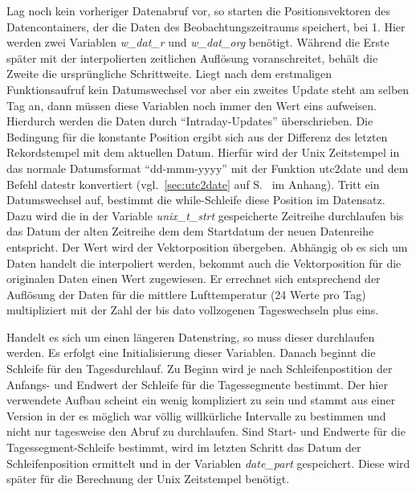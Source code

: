 Lag noch kein vorheriger Datenabruf vor, so starten die Positionsvektoren des Datencontainers, der die Daten des Beobachtungszeitraums speichert, bei 1. Hier werden zwei Variablen \textit{w\_dat\_r} und \textit{w\_dat\_org} benötigt. Während die Erste später mit der interpolierten zeitlichen Auflösung voranschreitet, behält die Zweite die ursprüngliche Schrittweite. Liegt nach dem erstmaligen Funktionsaufruf kein Datumswechsel vor aber ein zweites Update steht am selben Tag an, dann müssen diese Variablen noch immer den Wert eins aufweisen. Hierdurch werden die Daten durch \enquote{Intraday-Updates} überschrieben. Die Bedingung für die konstante Position ergibt sich aus der Differenz des letzten Rekordstempel mit dem aktuellen Datum. Hierfür wird der Unix Zeitstempel in das normale Datumsformat \enquote{dd-mmm-yyyy} mit der Funktion \textsf{utc2date} und dem Befehl \textsf{datestr} konvertiert (vgl.~\ref{sec:utc2date} auf S.~\pageref{sec:utc2date} im Anhang). Tritt ein Datumswechsel auf, bestimmt die while-Schleife diese Position im Datensatz. Dazu wird die in der Variable \textit{unix\_t\_strt} gespeicherte Zeitreihe durchlaufen bis das Datum der alten Zeitreihe dem dem Startdatum der neuen Datenreihe entspricht. Der Wert wird der Vektorposition übergeben. Abhängig ob es sich um Daten handelt die interpoliert werden, bekommt auch die Vektorposition für die originalen Daten einen Wert zugewiesen. Er errechnet sich entsprechend der Auflösung der Daten für die mittlere Lufttemperatur (24 Werte pro Tag) multipliziert mit der Zahl der bis dato vollzogenen Tageswechseln plus eins.   

Handelt es sich um einen längeren Datenstring, so muss dieser durchlaufen werden. Es erfolgt eine Initialisierung dieser Variablen. Danach beginnt die Schleife für den Tagesdurchlauf. Zu Beginn wird je nach Schleifenpostition der Anfangs- und Endwert der Schleife für die Tagessegmente bestimmt. Der hier verwendete Aufbau scheint ein wenig kompliziert zu sein und stammt aus einer Version in der es möglich war völlig willkürliche Intervalle zu bestimmen und nicht nur tagesweise den Abruf zu durchlaufen. Sind Start- und Endwerte für die Tagessegment-Schleife bestimmt, wird im letzten Schritt das Datum der Schleifenposition ermittelt und in der Variablen \textit{date\_part} gespeichert. Diese wird später für die Berechnung der Unix Zeitstempel benötigt.        

